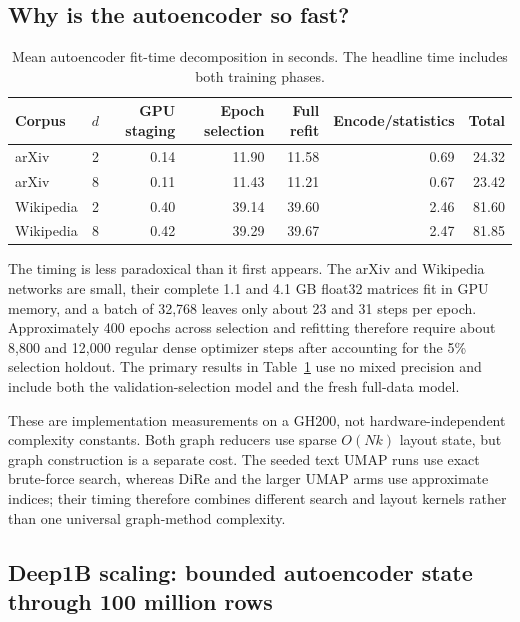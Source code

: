 \documentclass[10pt]{article}
\begin{document}
\subsection{Why is the autoencoder so fast?}

\begin{table}[ht]
\centering
\small
\begin{tabular}{lrrrrrr}
\toprule
Corpus & $d$ & GPU staging & Epoch selection & Full refit & Encode/statistics & Total\\
\midrule
arXiv & 2 & 0.14 & 11.90 & 11.58 & 0.69 & 24.32\\
arXiv & 8 & 0.11 & 11.43 & 11.21 & 0.67 & 23.42\\
Wikipedia & 2 & 0.40 & 39.14 & 39.60 & 2.46 & 81.60\\
Wikipedia & 8 & 0.42 & 39.29 & 39.67 & 2.47 & 81.85\\
\bottomrule
\end{tabular}
\caption{Mean autoencoder fit-time decomposition in seconds.  The headline time includes
both training phases.}
\label{tab:timing}
\end{table}

The timing is less paradoxical than it first appears.  The arXiv and Wikipedia networks
are small, their complete 1.1 and 4.1 GB float32 matrices fit in GPU memory, and a batch
of 32,768 leaves only about 23 and 31 steps per epoch.  Approximately 400 epochs across
selection and refitting therefore require about 8,800 and 12,000 regular dense optimizer steps after
accounting for the 5\% selection holdout.  The primary results in
Table~\ref{tab:timing} use no mixed precision and include both the validation-selection
model and the fresh full-data model.

These are implementation measurements on a GH200, not hardware-independent complexity
constants.  Both graph reducers use sparse $O(Nk)$ layout state, but graph construction
is a separate cost.  The seeded text UMAP runs use exact brute-force search, whereas
DiRe and the larger UMAP arms use approximate indices; their timing therefore combines
different search and layout kernels rather than one universal graph-method complexity.

\subsection{Deep1B scaling: bounded autoencoder state through 100 million rows}
\end{document}
